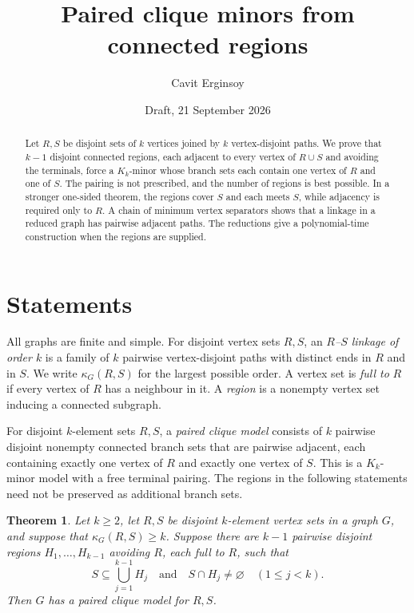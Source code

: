 \documentclass[11pt]{amsart}
\title[Paired clique minors]{Paired clique minors from connected regions}
\author{Cavit Erginsoy}
\date{Draft, 21 September 2026}
\newtheorem{theorem}{Theorem}[section]
\begin{document}
\begin{abstract}
Let $R,S$ be disjoint sets of $k$ vertices joined by $k$ vertex-disjoint
paths. We prove that $k-1$ disjoint connected regions, each adjacent to
every vertex of $R\cup S$ and avoiding the terminals, force a $K_k$-minor
whose branch sets each contain one vertex of $R$ and one of $S$.
The pairing is not prescribed, and the number of regions is best
possible. In a stronger one-sided theorem, the regions cover $S$ and
each meets $S$, while adjacency is required only to $R$. A chain of
minimum vertex separators shows that a linkage in a reduced graph has
pairwise adjacent paths. The reductions give a polynomial-time
construction when the regions are supplied.
\end{abstract}
\maketitle

\section{Statements}

All graphs are finite and simple. For disjoint vertex sets $R,S$,
an \emph{$R$--$S$ linkage of order $k$} is a family of $k$ pairwise
vertex-disjoint paths with distinct ends in $R$ and in $S$. We write
$\kappa_G(R,S)$ for the largest possible order. A vertex set is
\emph{full to} $R$ if every vertex of $R$ has a neighbour in it.
A \emph{region} is a nonempty vertex set inducing a connected subgraph.

For disjoint $k$-element sets $R,S$, a \emph{paired clique model} consists
of $k$ pairwise disjoint nonempty connected branch sets that are pairwise
adjacent, each containing exactly one vertex of $R$ and exactly one
vertex of $S$. This is a $K_k$-minor model with a free terminal pairing.
The regions in the following statements need not be preserved as
additional branch sets.

\begin{theorem}\label{thm:one-sided}
Let $k\geq2$, let $R,S$ be disjoint $k$-element vertex sets in a graph
$G$, and suppose that $\kappa_G(R,S)\geq k$. Suppose there are $k-1$
pairwise disjoint regions $H_1,\ldots,H_{k-1}$ avoiding $R$, each full
to $R$, such that
\[
 S\subseteq\bigcup_{j=1}^{k-1}H_j
 \quad\text{and}\quad S\cap H_j\ne\varnothing\quad(1\leq j<k).
\]
Then $G$ has a paired clique model for $R,S$.
\end{theorem}
\end{document}
